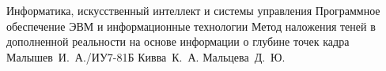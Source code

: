 \documentclass[a4paper]{bmstu}
\begin{document}
\makethesistitle
{Информатика, искусственный интеллект и системы управления} %
{Программное обеспечение ЭВМ и информационные технологии} %
{Метод наложения теней в дополненной реальности на основе информации о глубине точек кадра} %
{Малышев~И.~А./ИУ7-81Б} %
{Кивва~К.~А.} %
{} %
{Мальцева~Д.~Ю.} %
\end{document}
